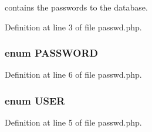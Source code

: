 contains the passwords to the database. 



Definition at line 3 of file passwd.php.

\hypertarget{passwd_8php_a3326d90c69de890a754f0806f94607e2}{
\subsubsection[{PASSWORD}]{\setlength{\rightskip}{0pt plus 5cm}enum {\bf PASSWORD}}}
\label{passwd_8php_a3326d90c69de890a754f0806f94607e2}


Definition at line 6 of file passwd.php.

\hypertarget{passwd_8php_ae355ff3a4a5960b855abdbe2666e5e1d}{
\subsubsection[{USER}]{\setlength{\rightskip}{0pt plus 5cm}enum {\bf USER}}}
\label{passwd_8php_ae355ff3a4a5960b855abdbe2666e5e1d}


Definition at line 5 of file passwd.php.

